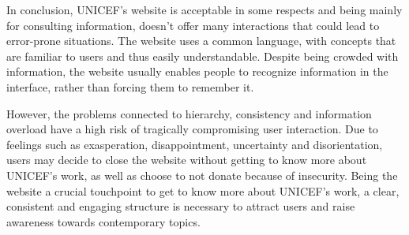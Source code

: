 In conclusion, UNICEF’s website is acceptable in some respects and being mainly for consulting information, doesn’t offer many interactions that could lead to error-prone situations. The website uses a common language, with concepts that are familiar to users and thus easily understandable. Despite being crowded with information, the website usually enables people to recognize information in the interface, rather than forcing them to remember it.

However, the problems connected to hierarchy, consistency and information overload have a high risk of tragically compromising user interaction. Due to feelings such as exasperation, disappointment, uncertainty and disorientation, users may decide to close the website without getting to know more about UNICEF’s work, as well as choose to not donate because of insecurity. Being the website a crucial touchpoint to get to know more about UNICEF’s work, a clear, consistent and engaging structure is necessary to attract users and raise awareness towards contemporary topics.


